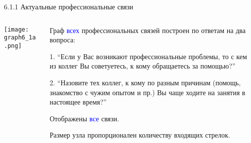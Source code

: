 \begin{frame}{6.1.1 Актуальные профессиональные связи}

\begin{columns} 
\begin{column}{0.75\textwidth} 
\centering
          \texttt{[image: graph6\_1a.png]}
\end{column}
\begin{column}{0.25\textwidth} 

\tiny
Граф \textcolor{blue}{всех} профессиональных связей построен по ответам на два вопроса:
\smallskip

1. ``Если у Вас возникают профессиональные проблемы, то с кем из коллег Вы советуетесь, к кому обращаетесь за помощью?''
\smallskip

2. ``Назовите тех коллег, к кому по разным причинам (помощь, знакомство с чужим опытом и пр.) Вы чаще ходите на занятия в настоящее время?''
\smallskip

Отображены \textcolor{blue}{все} связи. 
\smallskip

Размер узла пропорционален количеству входящих стрелок.

\end{column}
\end{columns}
\end{frame}


